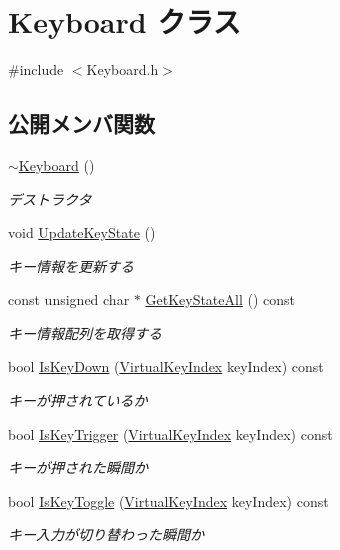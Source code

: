 \hypertarget{class_keyboard}{}\section{Keyboard クラス}
\label{class_keyboard}


{\ttfamily \#include $<$Keyboard.\+h$>$}

\subsection*{公開メンバ関数}
\begin{DoxyCompactItemize}
\item 
\mbox{\hyperlink{class_keyboard_af6a99ec66c8c722a45b967bf79167038}{$\sim$\+Keyboard}} ()
\begin{DoxyCompactList}\small\item\em デストラクタ \end{DoxyCompactList}\item 
void \mbox{\hyperlink{class_keyboard_a521e2533e12aa4841c8c56c4c3dfccfc}{Update\+Key\+State}} ()
\begin{DoxyCompactList}\small\item\em キー情報を更新する \end{DoxyCompactList}\item 
const unsigned char $\ast$ \mbox{\hyperlink{class_keyboard_a630b88caceef0ad8962446079fa858e1}{Get\+Key\+State\+All}} () const
\begin{DoxyCompactList}\small\item\em キー情報配列を取得する \end{DoxyCompactList}\item 
bool \mbox{\hyperlink{class_keyboard_ac9ac80ee73aa0b90d86ae7fba53906bd}{Is\+Key\+Down}} (\mbox{\hyperlink{_keyboard_8h_a50f7749e42959062d6f7ee3df6a2fd93}{Virtual\+Key\+Index}} key\+Index) const
\begin{DoxyCompactList}\small\item\em キーが押されているか \end{DoxyCompactList}\item 
bool \mbox{\hyperlink{class_keyboard_ad50dbd6947878292c3b5f22c07b5b613}{Is\+Key\+Trigger}} (\mbox{\hyperlink{_keyboard_8h_a50f7749e42959062d6f7ee3df6a2fd93}{Virtual\+Key\+Index}} key\+Index) const
\begin{DoxyCompactList}\small\item\em キーが押された瞬間か \end{DoxyCompactList}\item 
bool \mbox{\hyperlink{class_keyboard_af305159262c399f1f4ca48590153d5a8}{Is\+Key\+Toggle}} (\mbox{\hyperlink{_keyboard_8h_a50f7749e42959062d6f7ee3df6a2fd93}{Virtual\+Key\+Index}} key\+Index) const
\begin{DoxyCompactList}\small\item\em キー入力が切り替わった瞬間か \end{DoxyCompactList}\end{DoxyCompactItemize}

